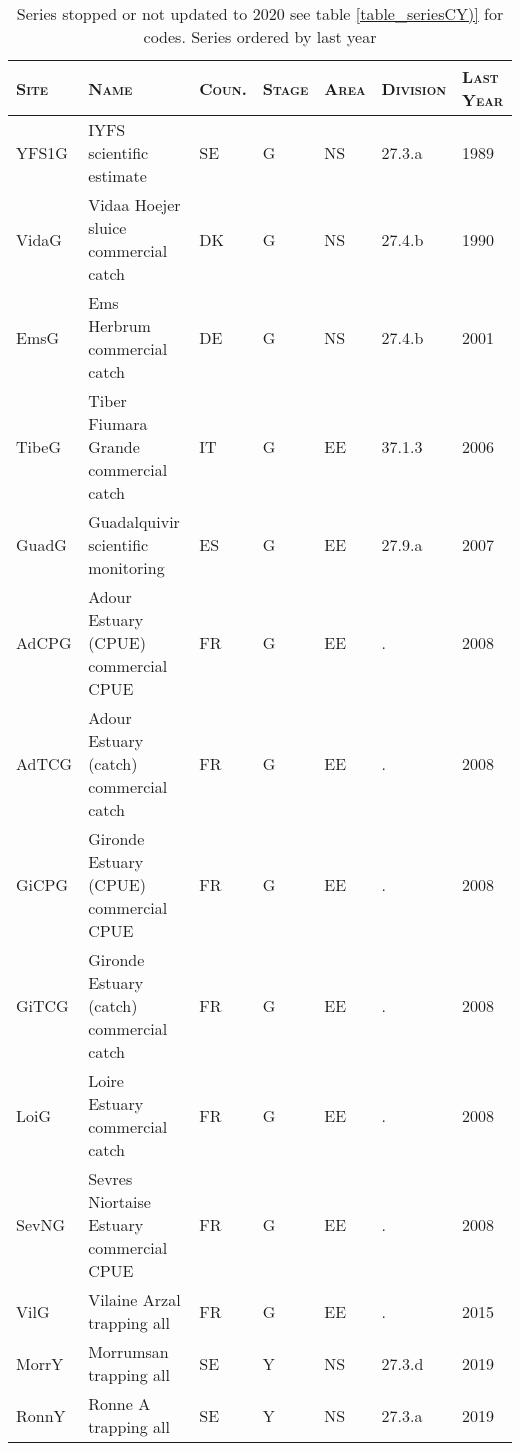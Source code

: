 \begin{table}[htbp]
\centering
\caption{Series stopped or not updated to 2020 see table \ref{table_seriesCY)} for codes. Series ordered by last year} 
\label{table_serieslost}
\begin{tabularx}{\textwidth}{p{1.3cm}p{6.5cm}p{1cm}p{1cm}p{1cm}p{1.4cm}p{1.2cm}}
  \hline
\scshape{Site} & \scshape{Name} & \scshape{Coun.} & \scshape{Stage} & \scshape{Area} & \scshape{Division} & \scshape{Last Year} \\ 
  \hline
YFS1G & IYFS scientific estimate & SE & G & NS & 27.3.a & 1989 \\ 
  VidaG & Vidaa Hoejer sluice commercial catch & DK & G & NS & 27.4.b & 1990 \\ 
  EmsG & Ems Herbrum commercial catch & DE & G & NS & 27.4.b & 2001 \\ 
  TibeG & Tiber Fiumara Grande commercial catch & IT & G & EE & 37.1.3 & 2006 \\ 
  GuadG & Guadalquivir scientific monitoring & ES & G & EE & 27.9.a & 2007 \\ 
  AdCPG & Adour Estuary (CPUE) commercial CPUE & FR & G & EE & . & 2008 \\ 
  AdTCG & Adour Estuary (catch) commercial catch & FR & G & EE & . & 2008 \\ 
  GiCPG & Gironde Estuary (CPUE) commercial CPUE & FR & G & EE & . & 2008 \\ 
  GiTCG & Gironde Estuary (catch) commercial catch & FR & G & EE & . & 2008 \\ 
  LoiG & Loire Estuary commercial catch & FR & G & EE & . & 2008 \\ 
  SevNG & Sevres Niortaise Estuary commercial CPUE & FR & G & EE & . & 2008 \\ 
  VilG & Vilaine Arzal trapping all & FR & G & EE & . & 2015 \\ 
  MorrY & Morrumsan  trapping all & SE & Y & NS & 27.3.d & 2019 \\ 
  RonnY & Ronne A  trapping all & SE & Y & NS & 27.3.a & 2019 \\ 
   \hline
\end{tabularx}
\end{table}
